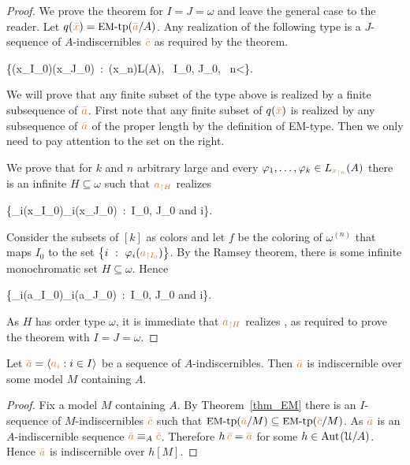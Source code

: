 \begin{proof}
We prove the theorem for $I=J=\omega$ and leave the general case to the reader.
Let $q({\color{brown}\bar x})=\mbox{{\small EM}-tp}({\color{brown}\bar a}/A)$.
Any realization of the following type is a $J$-sequence of $A$-indiscernibles ${\color{brown}\bar c}$ as required by the theorem.

{\cup}
{\Big\{\phi({\mr x_{\restriction I_0}})\iff\phi({\mr x_{\restriction J_0}})\ :\  \phi({\mr x_{\restriction n}})\in L(A), \ I_0, J_0\in{}, \ n<\omega\Big\}.}

We will prove that any finite subset of the type above is realized by a finite subsequence of ${\color{brown}\bar a}$.
First note that any finite subset of $q({\color{brown}\bar x})$ is realized by any subsequence of ${\color{brown}\bar a}$ of the proper length by the definition of EM-type.
Then we only need to pay attention to the set on the right.

We prove that for $k$ and $n$ arbitrary large and every $\varphi_1,\dots,\varphi_k\in L_{\color{brown} x_{\restriction n}}(A)$ there is an infinite $H\subseteq\omega$ such that ${\color{brown} a_{\restriction H}}$ realizes

\ceq{\ssf{\#}}
{}
{\Big\{\phi_i({\mr x_{\restriction I_0}})\iff\phi_i({\mr x_{\restriction J_0}})\ :\  I_0, J_0\in{}\textrm{ and } i\in[k]\Big\}.}

Consider the subsets of $[k]$ as colors and let $f$ be the coloring of $\omega^{(n)}$ that maps $I_0$ to the set $\big\{i\ :\ \varphi_i({\color{brown} a_{\restriction I_0}})\big\}$.
By the Ramsey theorem,
there is some infinite monochromatic set $H\subseteq\omega$.
Hence

\ceq{}
{}
{\Big\{\phi_i({\mr a_{\restriction I_0}})\iff\phi_i({\mr a_{\restriction J_0}})\ :\  I_0, J_0\in{}\textrm{ and } i\in[k]\Big\}.}

As $H$ has order type $\omega$,
it is immediate that ${\color{brown} a_{\restriction H}}$ realizes \ssf{\#},
as required to prove the theorem with $I=J=\omega$.
\end{proof}


\begin{proposition}\label{prop_indiscernibles_set_model}
Let ${\color{brown}\bar a}=\langle{\color{brown}a_i}:i\in I\rangle$ be a sequence of $A$-indiscernibles.
Then ${\color{brown}\bar a}$ is indiscernible over some model $M$ containing $A$.
\end{proposition}

\begin{proof}
Fix a model $M$ containing $A$.
By Theorem~\ref{thm_EM} there is an $I$-sequence of $M$-indiscernibles ${\color{brown}\bar c}$ such that $\mbox{{\small EM}-tp}({\color{brown}\bar a}/M)\subseteq\mbox{{\small EM}-tp}({\color{brown}\bar c}/M)$.
As ${\color{brown}\bar a}$ is an $A$-indiscernible sequence ${\color{brown}\bar a}\equiv_A{\color{brown}\bar c}$.
Therefore $h\,{\color{brown}\bar c}={\color{brown}\bar a}$ for some $h\in{\rm Aut\kern.15ex}(\EuScript U/A)$.
Hence ${\color{brown}\bar a}$ is indiscernible over $h[M]$.
\end{proof}

